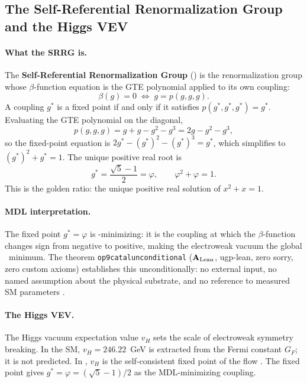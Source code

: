 \documentclass[11pt,openany]{book}
\theoremstyle{remark}
\newcommand{\GTE}{\text{GTE}}
\newcommand{\MDL}{\text{MDL}}
\newcommand{\lean}[1]{%
  \penalty-100
  \begingroup\def\_{\textunderscore\allowbreak}\texttt{#1}\endgroup}
\newcommand{\SRRG}{\text{SRRG}}
\newcommand{\CatAL}{\ensuremath{\textbf{A}_{\rm Lean}}}
\begin{document}
\subsection*{The Self-Referential Renormalization Group and the Higgs VEV}

\paragraph{What the SRRG is.}
The \textbf{Self-Referential Renormalization Group} (\SRRG{}) is the renormalization group
whose $\beta$-function equation is the GTE polynomial applied to its own coupling:
\begin{equation}
  \beta(g) = 0 \;\Longleftrightarrow\; g = p(g,g,g).
  \label{eq:srrg_def}
\end{equation}
A coupling $g^*$ is a fixed point if and only if it satisfies $p(g^*,g^*,g^*) = g^*$.
Evaluating the GTE polynomial on the diagonal,
\begin{equation}
  p(g,g,g) = g + g - g^2 - g^3 = 2g - g^2 - g^3,
\end{equation}
so the fixed-point equation is $2g^* - (g^*)^2 - (g^*)^3 = g^*$, which simplifies to
$(g^*)^2 + g^* = 1$.
The unique positive real root is
\begin{equation}
  g^* = \frac{\sqrt{5}-1}{2} = \varphi, \qquad \varphi^2 + \varphi = 1.
  \label{eq:srrg_golden}
\end{equation}
This is the golden ratio: the unique positive real solution of $x^2 + x = 1$.

\paragraph{MDL interpretation.}
The fixed point $g^* = \varphi$ is \MDL-minimizing: it is the coupling at which the
\SRRG{} $\beta$-function changes sign from negative to positive, making the electroweak
vacuum the global \MDL\ minimum.  The theorem \lean{op9\_catal\_unconditional} (\CatAL,
ugp-lean, zero sorry, zero custom axioms) establishes this unconditionally: no external
input, no named assumption about the physical substrate, and no reference to measured
SM parameters \cite{SpivackSRRG,SpivackGTEPolynomialUFT}.

\paragraph{The Higgs VEV.}
The Higgs vacuum expectation value $v_H$ sets the scale of electroweak symmetry breaking.
In the SM, $v_H = 246.22$~GeV is extracted from the Fermi constant $G_F$; it is not
predicted.  In \GTE{}, $v_H$ is the self-consistent fixed point of the \SRRG{} flow
\cite{SpivackSRRG}.  The \SRRG{} fixed point gives $g^* = \varphi = (\sqrt{5}-1)/2$ as
the MDL-minimizing coupling.
\end{document}
